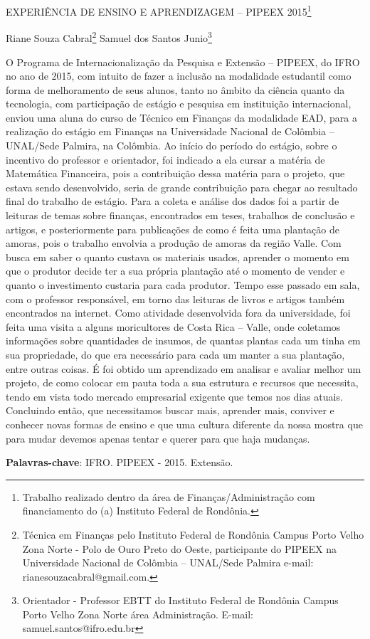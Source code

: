 \documentclass[article,12pt,onesidea,4paper,english,brazil]{abntex2}
\begin{document}
	
	
	\frenchspacing 
	
	\begin{center}
		\LARGE EXPERIÊNCIA DE ENSINO E APRENDIZAGEM – PIPEEX 2015\footnote{Trabalho realizado dentro da área de Finanças/Administração com financiamento do (a) Instituto Federal de Rondônia.}
		
		\normalsize
		Riane Souza Cabral\footnote{Técnica em Finanças pelo Instituto Federal de Rondônia Campus Porto Velho Zona Norte - Polo de Ouro Preto do Oeste, participante do PIPEEX na Universidade Nacional de Colômbia – UNAL/Sede Palmira e-mail: rianesouzacabral@gmail.com.} 
		Samuel dos Santos Junio\footnote{Orientador - Professor EBTT do Instituto Federal de Rondônia Campus Porto Velho Zona Norte área Administração. E-mail: samuel.santos@ifro.edu.br} 
	\end{center}
	
	\noindent O Programa de Internacionalização da Pesquisa e Extensão – PIPEEX, do IFRO no ano de 2015, com intuito de fazer a inclusão na modalidade estudantil como forma de melhoramento de seus alunos, tanto no âmbito da ciência quanto da tecnologia, com participação de estágio e pesquisa em instituição internacional, enviou uma aluna do curso de Técnico em Finanças da modalidade EAD, para a realização do estágio em Finanças na Universidade Nacional de Colômbia – UNAL/Sede Palmira, na Colômbia. Ao início do período do estágio, sobre o incentivo do professor e orientador, foi indicado a ela cursar a matéria de Matemática Financeira, pois a contribuição dessa matéria para o projeto, que estava sendo desenvolvido, seria de grande contribuição para chegar ao resultado final do trabalho de estágio. Para a coleta e análise dos dados foi a partir de leituras de temas sobre finanças, encontrados em teses, trabalhos de conclusão e artigos, e posteriormente para publicações de como é feita uma plantação de amoras, pois o trabalho envolvia a produção de amoras da região Valle. Com busca em saber o quanto custava os materiais usados, aprender o momento em que o produtor decide ter a sua própria plantação até o momento de vender e quanto o investimento custaria para cada produtor. Tempo esse passado em sala, com o professor responsável, em torno das leituras de livros e artigos também encontrados na internet. Como atividade desenvolvida fora da universidade, foi feita uma visita a alguns moricultores de Costa Rica – Valle, onde coletamos informações sobre quantidades de insumos, de quantas plantas cada um tinha em sua propriedade, do que era necessário para cada um manter a sua plantação, entre outras coisas. É foi obtido um aprendizado em analisar e avaliar melhor um projeto, de como colocar em pauta toda a sua estrutura e recursos que necessita, tendo em vista todo mercado empresarial exigente que temos nos dias atuais. Concluindo então, que necessitamos buscar mais, aprender mais, conviver e conhecer novas formas de ensino e que uma cultura diferente da nossa mostra que para mudar devemos apenas tentar e querer para que haja mudanças.
	
	\vspace{\onelineskip}
	
	\noindent
	\textbf{Palavras-chave}: IFRO. PIPEEX - 2015. Extensão.
	
\end{document}
